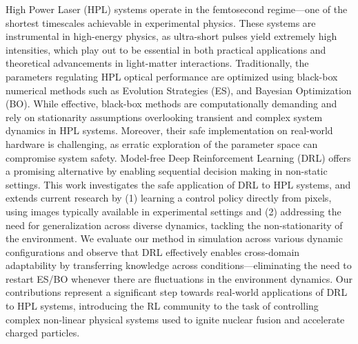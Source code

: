 High Power Laser (HPL) systems operate in the femtosecond regime---one of the shortest timescales achievable in experimental physics.
These systems are instrumental in high-energy physics, as ultra-short pulses yield extremely high intensities, which play out to be essential in both practical applications and theoretical advancements in light-matter interactions.
Traditionally, the parameters regulating HPL optical performance are optimized using black-box numerical methods such as Evolution Strategies (ES), and Bayesian Optimization (BO). While effective, black-box methods are computationally demanding and rely on stationarity assumptions overlooking transient and complex system dynamics in HPL systems. Moreover, their safe implementation on real-world hardware is challenging, as erratic exploration of the parameter space can compromise system safety.
Model-free Deep Reinforcement Learning (DRL) offers a promising alternative by enabling sequential decision making in non-static settings. 
This work investigates the safe application of DRL to HPL systems, and extends current research by (1) learning a control policy directly from pixels, using images typically available in experimental settings and (2) addressing the need for generalization across diverse dynamics, tackling the non-stationarity of the environment.
We evaluate our method in simulation across various dynamic configurations and observe that DRL effectively enables cross-domain adaptability by transferring knowledge across conditions---eliminating the need to restart ES/BO whenever there are fluctuations in the environment dynamics.
Our contributions represent a significant step towards real-world applications of DRL to HPL systems, introducing the RL community to the task of controlling complex non-linear physical systems used to ignite nuclear fusion and accelerate charged particles.